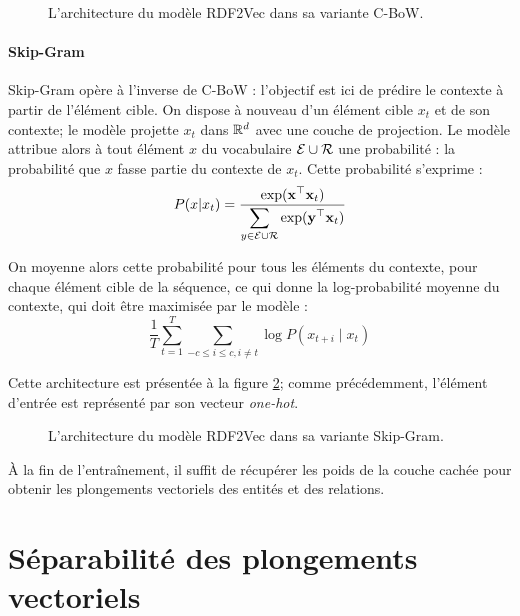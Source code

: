 \begin{figure}[h]
    \centering
    
    \caption[Architecture de RDF2Vec-CBoW]{L'architecture du modèle RDF2Vec dans sa variante C-BoW.}
    \label{fig:rdf2vec-cbow}
\end{figure}

\paragraph{Skip-Gram}

Skip-Gram opère à l'inverse de C-BoW : l'objectif est ici de prédire le contexte à partir de l'élément cible. On dispose à nouveau d'un élément cible $x_t$ et de son contexte; le modèle projette $x_t$ dans $\mathbb{R}^d$ avec une couche de projection. Le modèle attribue alors à tout élément $x$ du vocabulaire $\mathcal{E} \cup \mathcal{R}$ une probabilité : la probabilité que $x$ fasse partie du contexte de $x_t$. Cette probabilité s'exprime :
\begin{equation}
    P(x | x_t) = \frac{
    \displaystyle \exp(\mathbf{x}^\top \mathbf{x}_t)}
    {\displaystyle \sum_{y \in \mathcal{E} \cup \mathcal{R}} \exp(\mathbf{y}^\top \mathbf{x}_t)}
\end{equation}

On moyenne alors cette probabilité pour tous les éléments du contexte, pour chaque élément cible de la séquence, ce qui donne la log-probabilité moyenne du contexte, qui doit être maximisée par le modèle :
\begin{equation}
    \frac{1}{T} \sum_{t = 1}^{T} \sum_{-c \leq i \leq c, i \neq t} \log P(x_{t+i} \mid x_t)
\end{equation}

Cette architecture est présentée à la figure \ref{fig:rdf2vec-skipgram}; comme précédemment, l'élément d'entrée est représenté par son vecteur \textit{one-hot}.

\begin{figure}[h]
    \centering
    
    \caption[Architecture de RDF2Vec-Skip-Gram]{L'architecture du modèle RDF2Vec dans sa variante Skip-Gram.}
    \label{fig:rdf2vec-skipgram}
\end{figure}

À la fin de l'entraînement, il suffit de récupérer les poids de la couche cachée pour obtenir les plongements vectoriels des entités et des relations.

 


\FloatBarrier


\section{Séparabilité des plongements vectoriels}


